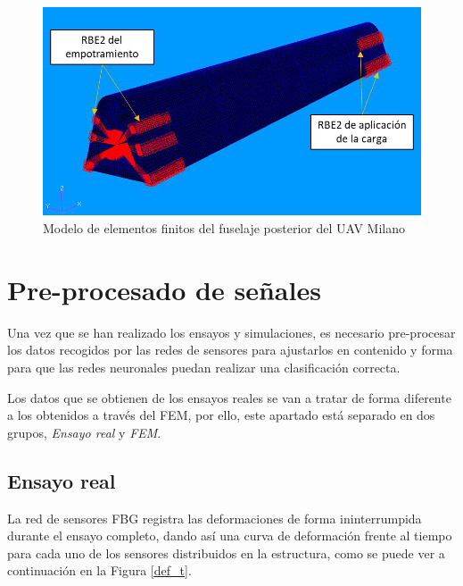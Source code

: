 \begin{figure}[h!]
    \centering
    \includegraphics[width=120mm]{3/Fotos/femest.png}
    \captionsetup{justification=centering,margin=1.25cm}
    \caption{Modelo de elementos finitos del fuselaje posterior del UAV Milano}
    \label{femest}
\end{figure}




\section{Pre-procesado de señales}

Una vez que se han realizado los ensayos y simulaciones, es necesario pre-procesar los datos recogidos por las redes de sensores para ajustarlos en contenido y forma para que las redes neuronales puedan realizar una clasificación correcta.

Los datos que se obtienen de los ensayos reales se van a tratar de forma diferente a los obtenidos a través del FEM, por ello, este apartado está separado en dos grupos, \textit{Ensayo real} y \textit{FEM}.

\subsection{Ensayo real}
    
La red de sensores FBG registra las deformaciones de forma ininterrumpida durante el ensayo completo, dando así una curva de deformación frente al tiempo para cada uno de los sensores distribuidos en la estructura, como se puede ver a continuación en la Figura \ref{def_t}.\\
    

